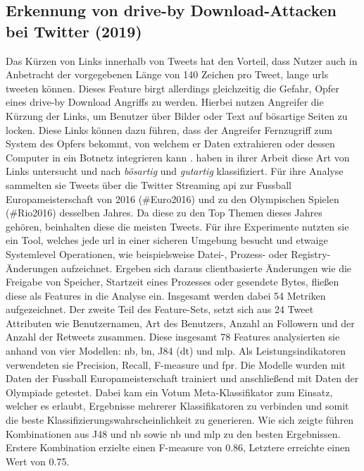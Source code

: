 \documentclass[
    12pt, %
    DIV10,
    ngerman, %
    a4paper, %
    oneside, %
    titlepage, %
    parskip=half, %
    headings=normal, %
    listof=totoc, %
    bibliography=totoc, %
    index=totoc, %
    captions=tableheading, %
    final %
]{scrreprt}
\begin{document}
\subsection{Erkennung von drive-by Download-Attacken bei Twitter (2019)}
Das Kürzen von Links innerhalb von Tweets hat den Vorteil, dass Nutzer auch in Anbetracht der vorgegebenen Länge von 140 Zeichen pro Tweet, lange \ac{urls} tweeten können. Dieses Feature birgt allerdings gleichzeitig die Gefahr, Opfer eines drive-by Download Angriffs zu werden. Hierbei nutzen Angreifer die Kürzung der Links, um Benutzer über Bilder oder Text auf bösartige Seiten zu locken. Diese Links können dazu führen, dass der Angreifer Fernzugriff zum System des Opfers bekommt, von welchem er Daten extrahieren oder dessen Computer in ein Botnetz integrieren kann \parencite{provos2007ghost}.
\textcite{Javed2019} haben in ihrer Arbeit diese Art von Links untersucht und nach \emph{bösartig} und \emph{gutartig} klassifiziert. Für ihre Analyse sammelten sie Tweets über die Twitter Streaming \ac{api} zur Fussball Europameisterschaft von 2016 (\#Euro2016) und zu den Olympischen Spielen (\#Rio2016) desselben Jahres. Da diese zu den Top Themen dieses Jahres gehören, beinhalten diese die meisten Tweets. Für ihre Experimente nutzten sie ein Tool, welches jede \ac{url} in einer sicheren Umgebung besucht und etwaige Systemlevel Operationen, wie beispielsweise Datei-, Prozess- oder Registry-Änderungen aufzeichnet. Ergeben sich daraus clientbasierte Änderungen wie die Freigabe von Speicher, Startzeit eines Prozesses oder gesendete Bytes, flie{\ss}en diese als Features in die Analyse ein. Insgesamt werden dabei 54 Metriken aufgezeichnet. Der zweite Teil des Feature-Sets, setzt sich aus 24 Tweet Attributen wie Benutzernamen, Art des Benutzers, Anzahl an Followern und der Anzahl der Retweets zusammen. Diese insgesamt 78 Features analysierten sie anhand von vier Modellen: \acl{nb}, \acl{bn}, J84 (\acl{dt}) und \ac{mlp}. Als Leistungsindikatoren verwendeten sie Precision, Recall, F-measure und \ac{fpr}. Die Modelle wurden mit Daten der Fussball Europameisterschaft trainiert und anschlie{\ss}end mit Daten der Olympiade getestet. Dabei kam ein Votum Meta-Klassifikator zum  Einsatz, welcher es erlaubt, Ergebnisse mehrerer Klassifikatoren zu verbinden und somit die beste Klassifizierungswahrscheinlichkeit zu generieren. Wie sich zeigte führen Kombinationen aus J48 und \ac{nb} sowie \ac{nb} und \ac{mlp} zu den besten Ergebnissen. Erstere Kombination erzielte einen F-measure von 0.86, Letztere erreichte einen Wert von 0.75.
\\\\
\end{document}

